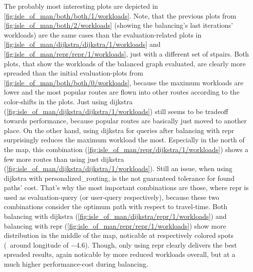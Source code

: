         The probably most interesting plots are depicted in \vref{fig:isle_of_man/both/both/1/workloads}.
        Note, that the previous plots from \vref{fig:isle_of_man/both/2/workloads} (showing the \gls{balancing}'s last iterations' workloads) are the same cases than the evaluation-related plots in \cref{fig:isle_of_man/dijkstra/dijkstra/1/workloads} and \cref{fig:isle_of_man/repr/repr/1/workloads}, just with a different set of \glspl{stpair}.
        Both plots, that show the workloads of the balanced graph evaluated, are clearly more spreaded than the initial evaluation-plots from \cref{fig:isle_of_man/both/both/0/workloads}, because the maximum workloads are lower and the most popular routes are flown into other routes according to the color-shifts in the plots.
        Just using \gls{dijkstra} (\cref{fig:isle_of_man/dijkstra/dijkstra/1/workloads}) still seems to be tradeoff towards performance, because popular routes are basically just moved to another place.
        On the other hand, using \gls{dijkstra} for queries after \gls{balancing} with \gls{repr} surprisingly reduces the maximum workload the most.
        Especially in the north of the map, this combination (\cref{fig:isle_of_man/repr/dijkstra/1/workloads}) shows a few more routes than using just \gls{dijkstra} (\cref{fig:isle_of_man/dijkstra/dijkstra/1/workloads}).
        Still an issue, when using \gls{dijkstra} with \gls{personalized_routing}, is the not guaranteed tolerance for found paths' cost.
        That's why the most important combinations are those, where \gls{repr} is used as evaluation-query (or user-query respectively), because these two combinations consider the optimum path with respect to travel-time.
        Both \gls{balancing} with \gls{dijkstra} (\cref{fig:isle_of_man/dijkstra/repr/1/workloads}) and \gls{balancing} with \gls{repr} (\cref{fig:isle_of_man/repr/repr/1/workloads}) show more distribution in the middle of the map, noticable at respectively colored spots (\eg\ around longitude of \num{-4.6}).
        Though, only using \gls{repr} clearly delivers the best spreaded results, again noticable by more reduced workloads overall, but at a much higher performance-cost during \gls{balancing}.

